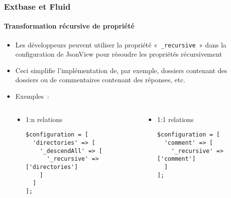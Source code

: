 %

\begin{frame}[fragile]
	\frametitle{Extbase et Fluid}
	\framesubtitle{Transformation récursive de propriété}


	\begin{itemize}
		\item Les développeurs peuvent utiliser la propriété «~\texttt{\_recursive}~» dans
			la configuration de JsonView pour résoudre les propriétés récursivement
		\item Ceci simplifie l'implémentation de, par exemple, dossiers
			contenant des dossiers ou de commentaires contenant des réponses, etc.
		\item Exemples~:
	\end{itemize}

	\begin{columns}[T]
		\begin{column}{.03\textwidth}
		\end{column}
		\begin{column}{.485\textwidth}
			\begin{itemize}\small
				\item 1:n relations
\begin{lstlisting}
$configuration = [
  'directories' => [
    '_descendAll' => [
      '_recursive' => ['directories']
    ]
  ]
];
\end{lstlisting}
			\end{itemize}\normalsize
		\end{column}
		\begin{column}{.485\textwidth}
			\begin{itemize}\small
				\item 1:1 relations
\begin{lstlisting}
$configuration = [
  'comment' => [
    '_recursive' => ['comment']
  ]
];
\end{lstlisting}
			\end{itemize}\normalsize
		\end{column}
	\end{columns}

\end{frame}

